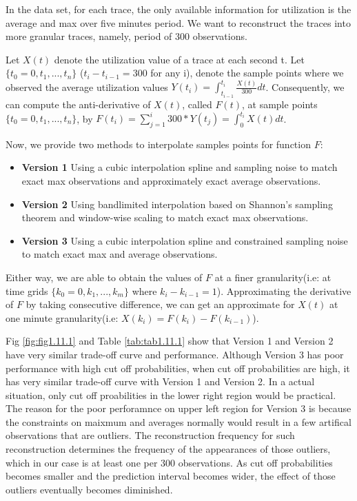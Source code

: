 \documentclass{article}
\begin{document}
\begin{flushleft}
In the data set, for each trace, the only available information for utilization
is the average and max over five minutes period. We want to reconstruct the
traces into more granular traces, namely, period of 300 observations.

Let $X(t)$ denote the utilization value of a trace at each second t. Let $\{t_0
= 0,t_1,...,t_n\}$ ($t_i - t_{i-1} = 300$ for any i), denote the sample points
where we observed the average utilization values $Y(t_i) =
\int_{t_{i-1}}^{t_i}\frac{X(t)}{300}dt$. Consequently, we can compute the
anti-derivative of $X(t)$, called $F(t)$, at sample points $\{t_0 =
0,t_1,...,t_n\}$, by $F(t_i) = \sum_{j=1}^{i} 300 * Y(t_j) =
\int_{0}^{t_i}X(t)dt$. 

Now, we provide two methods to interpolate samples points for function $F$:
\begin{itemize}
    \item \textbf{Version 1} Using a cubic interpolation spline and sampling
    noise to match exact max observations and approximately exact average
    observations.
    \item \textbf{Version 2} Using bandlimited interpolation based on Shannon's
    sampling theorem and window-wise scaling to match exact max observations.
    \item \textbf{Version 3} Using a cubic interpolation spline and constrained
    sampling noise to match exact max and average observations.
\end{itemize}

Either way, we are able to obtain the values of $F$ at a finer granularity(i.e:
at time grids $\{k_0 = 0, k_1, ..., k_m\}$ where $k_i - k_{i-1} = 1$).
Approximating the derivative of $F$ by taking consecutive difference, we can get
an approximate for $X(t)$ at one minute granularity(i.e: $X(k_i) = F(k_i) -
F(k_{i-1})$).    
\end{flushleft}

\begin{flushleft}
Fig \ref{fig:fig1.11.1} and Table \ref{tab:tab1.11.1} show that Version 1 and
Version 2 have very similar trade-off curve and performance. Although Version 3
has poor performance with high cut off probabilities, when cut off probabilities
are high, it has very similar trade-off curve with Version 1 and Version 2. In a
actual situation, only cut off proabilities in the lower right region would
be practical. The reason for the poor perforamnce on upper left region for
Version 3 is because the constraints on maixmum and averages normally would
result in a few artifical observations that are outliers. The reconstruction frequency for such
reconstruction determines the frequency of the appearances of those outliers,
which in our case is at least one per $300$ observations. As cut off
probabilities becomes smaller and the prediction interval becomes wider, the
effect of those outliers eventually becomes diminished.
\end{flushleft}
\end{document}
